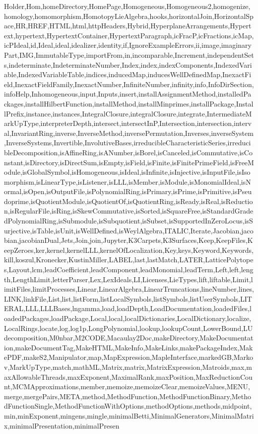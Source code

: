 {Holder,Hom,homeDirectory,HomePage,Homogeneous,Homogeneous2,homogenize,homology,homomorphism,HomotopyLieAlgebra,hooks,horizontalJoin,HorizontalSpace,HR,HREF,HTML,html,httpHeaders,Hybrid,HyperplaneArrangements,Hypertext,hypertext,HypertextContainer,HypertextParagraph,icFracP,icFractions,icMap,icPIdeal,id,Ideal,ideal,idealizer,identity,if,IgnoreExampleErrors,ii,image,imaginaryPart,IMG,ImmutableType,importFrom,in,incomparable,Increment,independentSets,indeterminate,IndeterminateNumber,Index,index,indexComponents,IndexedVariable,IndexedVariableTable,indices,inducedMap,inducesWellDefinedMap,InexactField,InexactFieldFamily,InexactNumber,InfiniteNumber,infinity,info,InfoDirSection,infoHelp,Inhomogeneous,input,Inputs,insert,installAssignmentMethod,installedPackages,installHilbertFunction,installMethod,installMinprimes,installPackage,InstallPrefix,instance,instances,IntegralClosure,integralClosure,integrate,IntermediateMarkUpType,interpreterDepth,intersect,intersectInP,Intersection,intersection,interval,InvariantRing,inverse,InverseMethod,inversePermutation,Inverses,inverseSystem,InverseSystems,Invertible,InvolutiveBases,irreducibleCharacteristicSeries,irreducibleDecomposition,isAffineRing,isANumber,isBorel,isCanceled,isCommutative,isConstant,isDirectory,isDirectSum,isEmpty,isField,isFinite,isFinitePrimeField,isFreeModule,isGlobalSymbol,isHomogeneous,isIdeal,isInfinite,isInjective,isInputFile,isIsomorphism,isLinearType,isListener,isLLL,isMember,isModule,isMonomialIdeal,isNormal,isOpen,isOutputFile,isPolynomialRing,isPrimary,isPrime,isPrimitive,isPseudoprime,isQuotientModule,isQuotientOf,isQuotientRing,isReady,isReal,isReduction,isRegularFile,isRing,isSkewCommutative,isSorted,isSquareFree,isStandardGradedPolynomialRing,isSubmodule,isSubquotient,isSubset,isSupportedInZeroLocus,isSurjective,isTable,isUnit,isWellDefined,isWeylAlgebra,ITALIC,Iterate,Jacobian,jacobian,jacobianDual,Jets,Join,join,Jupyter,K3Carpets,K3Surfaces,Keep,KeepFiles,KeepZeroes,ker,kernel,kernelLLL,kernelOfLocalization,Key,keys,Keyword,Keywords,kill,koszul,Kronecker,KustinMiller,LABEL,last,lastMatch,LATER,LatticePolytopes,Layout,lcm,leadCoefficient,leadComponent,leadMonomial,leadTerm,Left,left,length,LengthLimit,letterParser,Lex,LexIdeals,LI,Licenses,LieTypes,lift,liftable,Limit,limitFiles,limitProcesses,Linear,LinearAlgebra,LinearTruncations,lineNumber,lines,LINK,linkFile,List,list,listForm,listLocalSymbols,listSymbols,listUserSymbols,LITERAL,LLL,LLLBases,lngamma,load,loadDepth,LoadDocumentation,loadedFiles,loadedPackages,loadPackage,Local,local,localDictionaries,LocalDictionary,localize,LocalRings,locate,log,log1p,LongPolynomial,lookup,lookupCount,LowerBound,LUdecomposition,M0nbar,M2CODE,Macaulay2Doc,makeDirectory,MakeDocumentation,makeDocumentTag,MakeHTML,MakeInfo,MakeLinks,makePackageIndex,MakePDF,makeS2,Manipulator,map,MapExpression,MapleInterface,markedGB,Markov,MarkUpType,match,mathML,Matrix,matrix,MatrixExpression,Matroids,max,maxAllowableThreads,maxExponent,MaximalRank,maxPosition,MaxReductionCount,MCMApproximations,member,memoize,memoizeClear,memoizeValues,MENU,merge,mergePairs,META,method,MethodFunction,MethodFunctionBinary,MethodFunctionSingle,MethodFunctionWithOptions,methodOptions,methods,midpoint,min,minExponent,mingens,mingle,minimalBetti,MinimalGenerators,MinimalMatrix,minimalPresentation,minimalPresen}
